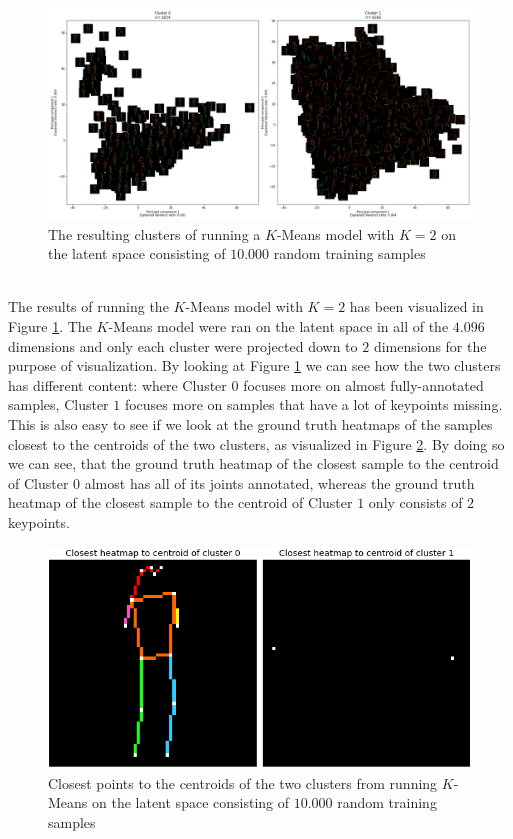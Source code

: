 \documentclass[./main.tex]{subfiles}
\begin{document}
\begin{figure}[htbp]
    \centering
    \includegraphics[width = \textwidth]{entities/cluster_all_skeletons.png}
    \caption{The resulting clusters of running a $K$-Means model with $K = 2$ on the latent space consisting of $10.000$ random training samples}
    \label{fig:clusters_all_skeletons}
\end{figure}
\\
The results of running the $K$-Means model with $K = 2$ has been visualized in Figure \ref{fig:clusters_all_skeletons}. The $K$-Means model were ran on the latent space in all of the $4.096$ dimensions and only each cluster were projected down to $2$ dimensions for the purpose of visualization. By looking at Figure \ref{fig:clusters_all_skeletons} we can see how the two clusters has different content: where Cluster $0$ focuses more on almost fully-annotated samples, Cluster $1$ focuses more on samples that have a lot of keypoints missing. This is also easy to see if we look at the ground truth heatmaps of the samples closest to the centroids of the two clusters, as visualized in Figure \ref{fig:centroids_all}. By doing so we can see, that the ground truth heatmap of the closest sample to the centroid of Cluster $0$ almost has all of its joints annotated, whereas the ground truth heatmap of the closest sample to the centroid of Cluster $1$ only consists of $2$ keypoints.
\\
\begin{figure}[htbp]
    \centering
    \includegraphics[height = 4 cm]{entities/centroids_all_skeletons.png}
    \caption{Closest points to the centroids of the two clusters from running $K$-Means on the latent space consisting of $10.000$ random training samples}
    \label{fig:centroids_all}
\end{figure}
\end{document}
